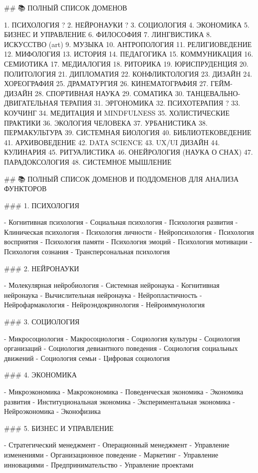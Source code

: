 ## 📚 ПОЛНЫЙ СПИСОК ДОМЕНОВ 

1. ПСИХОЛОГИЯ ?
2. НЕЙРОНАУКИ ?
3. СОЦИОЛОГИЯ 
4. ЭКОНОМИКА 
5. БИЗНЕС И УПРАВЛЕНИЕ 
6. ФИЛОСОФИЯ 
7. ЛИНГВИСТИКА
8. ИСКУССТВО (art)
9. МУЗЫКА
10. АНТРОПОЛОГИЯ 
11. РЕЛИГИОВЕДЕНИЕ
12. МИФОЛОГИЯ
13. ИСТОРИЯ 
14. ПЕДАГОГИКА 
15. КОММУНИКАЦИЯ 
16. СЕМИОТИКА 
17. МЕДИАЛОГИЯ
18. РИТОРИКА
19. ЮРИСПРУДЕНЦИЯ
20. ПОЛИТОЛОГИЯ 
21. ДИПЛОМАТИЯ 
22. КОНФЛИКТОЛОГИЯ 
23. ДИЗАЙН
24. ХОРЕОГРАФИЯ
25. ДРАМАТУРГИЯ 
26. КИНЕМАТОГРАФИЯ
27. ГЕЙМ-ДИЗАЙН 
28. СПОРТИВНАЯ НАУКА
29. СОМАТИКА 
30. ТАНЦЕВАЛЬНО-ДВИГАТЕЛЬНАЯ ТЕРАПИЯ
31. ЭРГОНОМИКА
32. ПСИХОТЕРАПИЯ ?
33. КОУЧИНГ 
34. МЕДИТАЦИЯ И MINDFULNESS 
35. ХОЛИСТИЧЕСКИЕ ПРАКТИКИ
36. ЭКОЛОГИЯ ЧЕЛОВЕКА
37. УРБАНИСТИКА
38. ПЕРМАКУЛЬТУРА
39. СИСТЕМНАЯ БИОЛОГИЯ
40. БИБЛИОТЕКОВЕДЕНИЕ
41. АРХИВОВЕДЕНИЕ
42. DATA SCIENCE 
43. UX/UI ДИЗАЙН 
44. КУЛИНАРИЯ
45. РИТУАЛИСТИКА 
46. ОНЕЙРОЛОГИЯ (НАУКА О СНАХ)
47. ПАРАДОКСОЛОГИЯ 
48. СИСТЕМНОЕ МЫШЛЕНИЕ 

## 📚 ПОЛНЫЙ СПИСОК ДОМЕНОВ И ПОДДОМЕНОВ ДЛЯ АНАЛИЗА ФУНКТОРОВ

### 1. ПСИХОЛОГИЯ

- Когнитивная психология
- Социальная психология
- Психология развития
- Клиническая психология
- Психология личности
- Нейропсихология
- Психология восприятия
- Психология памяти
- Психология эмоций
- Психология мотивации
- Психология сознания
- Трансперсональная психология

### 2. НЕЙРОНАУКИ

- Молекулярная нейробиология
- Системная нейронаука
- Когнитивная нейронаука
- Вычислительная нейронаука
- Нейропластичность
- Нейрофармакология
- Нейроэндокринология
- Нейроиммунология

### 3. СОЦИОЛОГИЯ

- Микросоциология
- Макросоциология
- Социология культуры
- Социология организаций
- Социология девиантного поведения
- Социология социальных движений
- Социология семьи
- Цифровая социология

### 4. ЭКОНОМИКА

- Микроэкономика
- Макроэкономика
- Поведенческая экономика
- Экономика развития
- Институциональная экономика
- Экспериментальная экономика
- Нейроэкономика
- Эконофизика

### 5. БИЗНЕС И УПРАВЛЕНИЕ

- Стратегический менеджмент
- Операционный менеджмент
- Управление изменениями
- Организационное поведение
- Маркетинг
- Управление инновациями
- Предпринимательство
- Управление проектами

